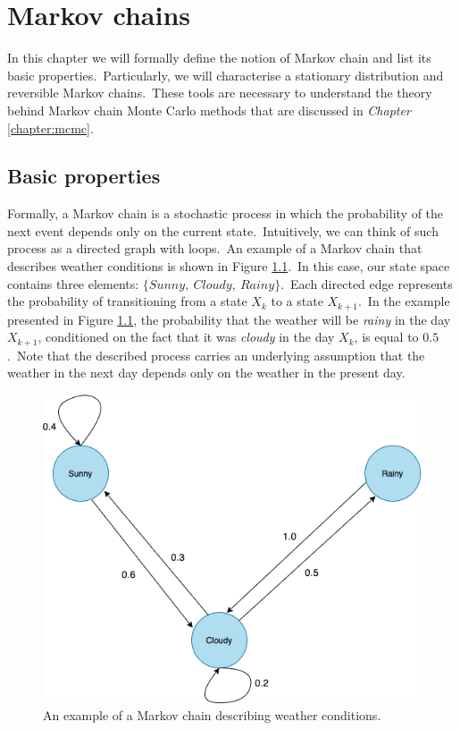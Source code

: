 \documentclass[a4paper, 11pt, onecolumn, openany, titlepage]{report}
\newcommand\numberedchapter[1]{\setlength\topskip{3cm}\chapter{#1}\setlength\topskip{0cm}}
\theoremstyle{default_theorem_style}\newtheorem{theorem}{Theorem}
\theoremstyle{default_theorem_style}\newtheorem{definition}{Definition}
\begin{document}
\numberedchapter{Markov chains}

In this chapter we will formally define the notion of Markov chain and list its basic properties.\ Particularly,
we will characterise a stationary distribution and reversible Markov chains.\ These tools are necessary to understand
the theory behind Markov chain Monte Carlo methods that are discussed in \textit{Chapter} \ref{chapter:mcmc}.

\section{Basic properties}

Formally, a Markov chain is a stochastic process in which the probability of the next event depends only on the current
state.\ Intuitively, we can think of such process as a directed graph with loops.\ An example of a Markov chain that
describes weather conditions is shown in Figure \ref{fig:markov_chain}.\ In this case, our state space contains three
elements: $\{Sunny,\ Cloudy,\ Rainy\}$.\ Each directed edge represents the probability of transitioning from a state
$X_k$ to a state $X_{k + 1}$.\ In the example presented in Figure \ref{fig:markov_chain}, the probability that the
weather will be \textit{rainy} in the day $X_{k + 1}$, conditioned on the fact that it was \textit{cloudy} in the
day $X_k$, is equal to $0.5$.\ Note that the described process carries an underlying assumption that the weather in
the next day depends only on the weather in the present day.

\begin{figure}[H]
\centering
\includegraphics[scale=0.4]{markov_chain}
\caption{An example of a Markov chain describing weather conditions.}
\label{fig:markov_chain}
\end{figure}
\end{document}
